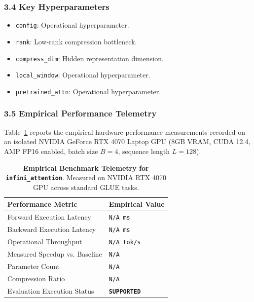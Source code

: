 \subsubsection*{3.4 Key Hyperparameters}
\begin{itemize}
    \item \texttt{config}: Operational hyperparameter.
    \item \texttt{rank}: Low-rank compression bottleneck.
    \item \texttt{compress\_dim}: Hidden representation dimension.
    \item \texttt{local\_window}: Operational hyperparameter.
    \item \texttt{pretrained\_attn}: Operational hyperparameter.
\end{itemize}

\subsubsection*{3.5 Empirical Performance Telemetry}
Table~\ref{tab:telemetry_infini_attention} reports the empirical hardware performance measurements recorded on an isolated NVIDIA GeForce RTX 4070 Laptop GPU (8GB VRAM, CUDA 12.4, AMP FP16 enabled, batch size $B=4$, sequence length $L=128$).

\begin{table}[h]
\centering
\small
\caption{\textbf{Empirical Benchmark Telemetry for \texttt{infini\_attention}}. Measured on NVIDIA RTX 4070 GPU across standard GLUE tasks.}
\label{tab:telemetry_infini_attention}
\begin{tabularx}{\columnwidth}{lX}
\toprule
\textbf{Performance Metric} & \textbf{Empirical Value} \\
\midrule
Forward Execution Latency & \texttt{N/A ms} \\
Backward Execution Latency & \texttt{N/A ms} \\
Operational Throughput & \texttt{N/A tok/s} \\
Measured Speedup vs. Baseline & \texttt{N/A} \\
Parameter Count & \texttt{N/A} \\
Compression Ratio & \texttt{N/A} \\
Evaluation Execution Status & \textbf{\texttt{SUPPORTED}} \\
\bottomrule
\end{tabularx}
\end{table}

